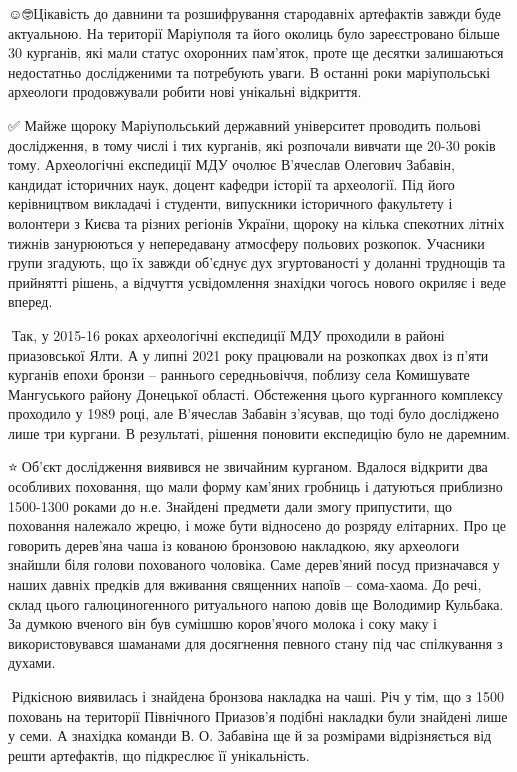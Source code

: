 ☺️🤓Цікавість до давнини та розшифрування стародавніх артефактів завжди буде
актуальною. На території Маріуполя та його околиць було зареєстровано більше 30
курганів, які мали статус охоронних пам’яток, проте ще десятки залишаються
недостатньо дослідженими та потребують уваги. В останні роки маріупольські
археологи продовжували робити нові унікальні відкриття.

✅️ Майже щороку Маріупольський державний університет проводить польові
дослідження, в тому числі і тих курганів, які розпочали вивчати ще 20-30 років
тому. Археологічні експедиції МДУ очолює В’ячеслав Олегович Забавін, кандидат
історичних наук, доцент кафедри історії та археології. Під його керівництвом
викладачі і студенти, випускники історичного факультету і волонтери з Києва та
різних регіонів України, щороку на кілька спекотних літніх тижнів занурюються у
непередавану атмосферу польових розкопок. Учасники групи згадують, що їх завжди
об’єднує дух згуртованості у доланні труднощів та прийнятті рішень, а відчуття
усвідомлення знахідки чогось нового окриляє і веде вперед.

📍Так, у 2015-16 роках археологічні експедиції МДУ проходили в районі
приазовської Ялти. А у липні 2021 року працювали на розкопках двох із п'яти
курганів епохи бронзи – раннього середньовіччя, поблизу села Комишувате
Мангуського району Донецької області. Обстеження цього курганного комплексу
проходило у 1989 році, але В'ячеслав Забавін з'ясував, що тоді було досліджено
лише три кургани. В результаті, рішення поновити експедицію було не даремним.

⭐️👏Об'єкт дослідження виявився не звичайним курганом. Вдалося відкрити два
особливих поховання, що мали форму кам'яних гробниць і датуються приблизно
1500-1300 роками до н.е. Знайдені предмети дали змогу припустити, що поховання
належало жрецю, і може бути відносено до розряду елітарних. Про це говорить
дерев'яна чаша із кованою бронзовою накладкою, яку археологи знайшли біля
голови похованого чоловіка. Саме дерев'яний посуд призначався у наших давніх
предків для вживання священних напоїв – сома-хаома. До речі, склад цього
галюциногенного ритуального напою довів ще Володимир Кульбака. За думкою
вченого він був сумішшю коров'ячого молока і соку маку і використовувався
шаманами для досягнення певного стану під час спілкування з духами.

📎Рідкісною виявилась і знайдена бронзова накладка на чаші. Річ у тім, що з
1500 поховань на території Північного Приазов'я подібні накладки були знайдені
лише у семи. А знахідка команди В. О. Забавіна ще й за розмірами відрізняється
від решти артефактів, що підкреслює її унікальність.

